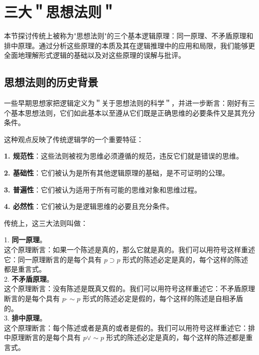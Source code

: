 \section{三大＂思想法则＂}

\begin{logicbox}[title=引言]
本节探讨传统上被称为"思想法则"的三个基本逻辑原理：同一原理、不矛盾原理和排中原理。通过分析这些原理的本质及其在逻辑推理中的应用和局限，我们能够更全面地理解形式逻辑的基础以及对这些原理的误解与批评。
\end{logicbox}

\subsection{思想法则的历史背景}

一些早期思想家把逻辑定义为＂关于思想法则的科学＂，并进一步断言：刚好有三个基本思想法则，它们如此基本以至遵从它们既是正确思维的必要条件又是其充分条件。

\begin{theorembox}[title=思想法则的哲学地位]
这种观点反映了传统逻辑学的一个重要特征：

\textbf{1. 规范性}：这些法则被视为思维必须遵循的规范，违反它们就是错误的思维。

\textbf{2. 基础性}：它们被认为是所有其他逻辑原理的基础，是不可证明的公理。

\textbf{3. 普遍性}：它们被认为适用于所有可能的思维对象和思维过程。

\textbf{4. 必然性}：它们被认为是逻辑思维的必要且充分条件。
\end{theorembox}

传统上，这三大法则叫做：

1. \textbf{同一原理}。\\
这个原理断言：如果一个陈述是真的，那么它就是真的。我们可以用符号这样重述它：同一原理断言的是每个具有 $p \supset p$ 形式的陈述必定是真的，每个这样的陈述都是重言式。\\

2. \textbf{不矛盾原理}。\\
这个原理断言：没有陈述是既真又假的。我们可以用符号这样重述它：不矛盾原理断言的是每个具有 $p \cdot \sim p$ 形式的陈述必定是假的，每个这样的陈述是自相矛盾的。\\

3. \textbf{排中原理}。\\
这个原理断言：每个陈述或者是真的或者是假的。我们可以用符号这样重述它：排中原理断言的是每个具有 $p \vee \sim p$ 形式的陈述必定是真的，每个这样的陈述都是重言式。

